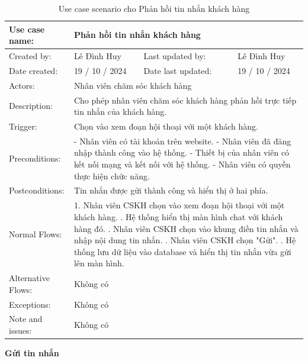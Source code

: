 \begin{table}[H]
    \centering
    \begin{tabular}{|l|l|l|l|} 
        \hline
        Use case name: & \multicolumn{3}{|l|}{Phản hồi tin nhắn khách hàng} \\
        \hline
        Created by: & Lê Đình Huy & Last updated by: & Lê Đình Huy \\
        \hline
        Date created: & 19 / 10 / 2024 & Date last updated: & 19 / 10 / 2024 \\
        \hline
        Actors: & \multicolumn{3}{|l|}{Nhân viên chăm sóc khách hàng} \\
        \hline
        Description: & \multicolumn{3}{|p{12cm}|}{Cho phép nhân viên chăm sóc khách hàng phản hồi trực tiếp tin nhắn của khách hàng.} \\ 
        \hline
        Trigger: & \multicolumn{3}{|p{12cm}|}{Chọn vào xem đoạn hội thoại với một khách hàng.} \\
        \hline
        Preconditions: & \multicolumn{3}{|p{12cm}|}{- Nhân viên có tài khoản trên website. \newline
        - Nhân viên đã đăng nhập thành công vào hệ thống. \newline
        - Thiết bị của nhân viên có kết nối mạng và kết nối với hệ thống. \newline
        - Nhân viên có quyền thực hiện chức năng.} \\
        \hline
        Postconditions: & \multicolumn{3}{|p{12cm}|}{Tin nhắn được gửi thành công và hiển thị ở hai phía.} \\
        \hline
        Normal Flows: & \multicolumn{3}{|p{12cm}|}{1. Nhân viên CSKH chọn vào xem đoạn hội thoại với một khách hàng. \newline
        2. Hệ thống hiển thị màn hình chat với khách hàng đó. \newline
        3. Nhân viên CSKH chọn vào khung điền tin nhắn và nhập nội dung tin nhắn. \newline
        4. Nhân viên CSKH chọn "Gửi". \newline
        5. Hệ thống lưu dữ liệu vào database và hiển thị tin nhắn vừa gửi lên màn hình.} \\
        \hline
        Alternative Flows: & \multicolumn{3}{|p{12cm}|}{Không có} \\
        \hline
        Exceptions: & \multicolumn{3}{|p{12cm}|}{Không có} \\
        \hline
        Note and issues: & \multicolumn{3}{|p{12cm}|}{Không có} \\
        \hline
    \end{tabular}
    \caption{Use case scenario cho Phản hồi tin nhắn khách hàng}
\end{table}
\textbf{Gửi tin nhắn}

